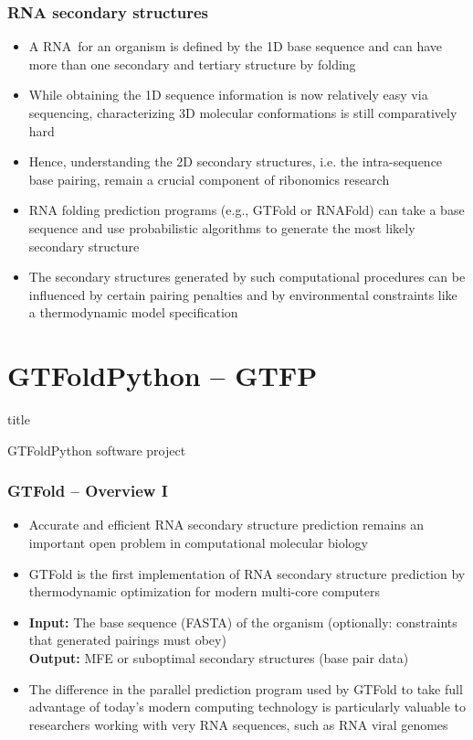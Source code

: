 \documentclass[usenames,svgnames,dvipsnames,11pt]{beamer}
\newcommand{\TitleBoxed}[1]{
     \begin{beamercolorbox}[sep=8pt,center,shadow=true,rounded=true]{title}
          \usebeamerfont{title}#1\par%
     \end{beamercolorbox}
}
\begin{document}
\begin{frame}
\frametitle{RNA secondary structures}
\begin{itemize} 

\item A RNA for an organism is defined by the 1D base sequence and can have more than one 
      secondary and tertiary structure by folding 
\item While obtaining the 1D sequence information is now relatively easy via sequencing, 
      characterizing 3D molecular conformations is still comparatively hard 
\item Hence, understanding the 2D secondary structures, i.e. the intra-sequence base pairing, remain a
      crucial component of ribonomics research
\item RNA folding prediction programs (e.g., GTFold or RNAFold) can take a base sequence 
      and use probabilistic algorithms to generate the most likely secondary structure 
\item The secondary structures generated by such computational procedures can be influenced by 
      certain pairing penalties and by environmental constraints like a thermodynamic model 
      specification 

\end{itemize}

\end{frame}

\section{GTFoldPython -- GTFP}

\begin{frame}
\TitleBoxed{
     \Huge{\centerline{GTFoldPython software project}}
}
\end{frame}

\begin{frame}
\frametitle{GTFold -- Overview I}

\begin{itemize} 

\item Accurate and efficient RNA secondary structure prediction remains an important 
      open problem in computational molecular biology 
\item GTFold is the first implementation of RNA secondary structure prediction by thermodynamic
      optimization for modern multi-core computers 
\item \textbf{Input:} The base sequence (FASTA) of the organism (optionally: constraints that generated pairings must obey) \\ 
      \textbf{Output:} MFE or suboptimal secondary structures (base pair data)
\item The difference in the parallel prediction program used by GTFold to take 
      full advantage of today's modern computing technology is particularly valuable to researchers working with very 
      RNA sequences, such as RNA viral genomes

\end{itemize}

\end{frame}
\end{document}

